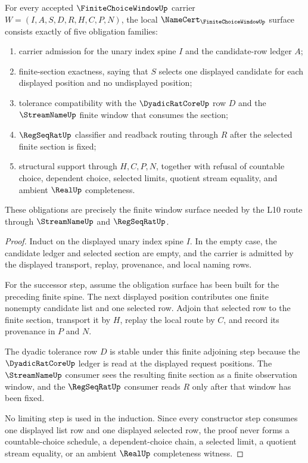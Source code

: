 \begin{theorem}
\label{thm:finite-choice-window-namecert-surface}
For every accepted $\FiniteChoiceWindowUp$ carrier $W=(I,A,S,D,R,H,C,P,N)$, the local $\NameCert_{\FiniteChoiceWindowUp}$ surface consists exactly of five obligation families:
\begin{enumerate}
\item carrier admission for the unary index spine $I$ and the candidate-row ledger $A$;
\item finite-section exactness, saying that $S$ selects one displayed candidate for each displayed position and no undisplayed position;
\item tolerance compatibility with the $\DyadicRatCoreUp$ row $D$ and the $\StreamNameUp$ finite window that consumes the section;
\item $\RegSeqRatUp$ classifier and readback routing through $R$ after the selected finite section is fixed;
\item structural support through $H,C,P,N$, together with refusal of countable choice, dependent choice, selected limits, quotient stream equality, and ambient $\RealUp$ completeness.
\end{enumerate}
These obligations are precisely the finite window surface needed by the L10 route through $\StreamNameUp$ and $\RegSeqRatUp$.
\end{theorem}
\begin{proof}
Induct on the displayed unary index spine $I$. In the empty case, the candidate ledger and selected section are empty, and the carrier is admitted by the displayed transport, replay, provenance, and local naming rows.

For the successor step, assume the obligation surface has been built for the preceding finite spine. The next displayed position contributes one finite nonempty candidate list and one selected row. Adjoin that selected row to the finite section, transport it by $H$, replay the local route by $C$, and record its provenance in $P$ and $N$.

The dyadic tolerance row $D$ is stable under this finite adjoining step because the $\DyadicRatCoreUp$ ledger is read at the displayed request positions. The $\StreamNameUp$ consumer sees the resulting finite section as a finite observation window, and the $\RegSeqRatUp$ consumer reads $R$ only after that window has been fixed.

No limiting step is used in the induction. Since every constructor step consumes one displayed list row and one displayed selected row, the proof never forms a countable-choice schedule, a dependent-choice chain, a selected limit, a quotient stream equality, or an ambient $\RealUp$ completeness witness.
\end{proof}

